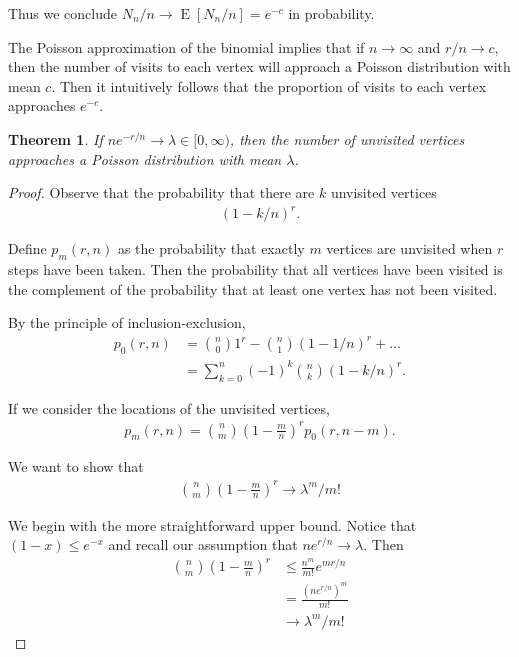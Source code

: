 \documentclass[12pt]{article}
\newtheorem{theorem}{Theorem}
\theoremstyle{definition}
\DeclareMathOperator{\E}{\mathrm{E}}		     %
\begin{document}
Thus we conclude $N_n/n \rightarrow \E[N_n/n] = e^{-c}$ in probability. 

The Poisson approximation of the binomial implies that if $n \rightarrow \infty$
and $r/n \rightarrow c$, then the number of visits to each vertex will approach
a Poisson distribution with mean $c$.
Then it intuitively follows that the proportion of visits to each vertex
approaches $e^{-c}$.

\begin{theorem}\label{thm:pois}
If $ne^{-r/n} \rightarrow \lambda \in [0, \infty)$, then the number of unvisited
vertices approaches a Poisson distribution with mean $\lambda$.
\end{theorem}

\begin{proof}
Observe that the probability that there are $k$ unvisited vertices
\begin{align}
(1-k/n)^r \nonumber.
\end{align}

Define $p_m(r,n)$ as the probability that exactly $m$ vertices are unvisited
when $r$ steps have been taken.
Then the probability that all vertices have been visited is the complement
of the probability that at least one vertex has not been visited.

By the principle of inclusion-exclusion,
\begin{align}
p_0(r,n) &= {n \choose 0} 1^r - {n \choose 1} (1-1/n)^r + ... \nonumber\\
&= \sum_{k=0}^n (-1)^k {n \choose k} (1-k/n)^r. \nonumber
\end{align}

If we consider the locations of the unvisited vertices,
\begin{align}
p_m(r,n) = {n \choose m} \left(1-\frac{m}{n}\right)^r p_0(r, n-m). \nonumber
\end{align}

We want to show that 
\begin{align}
{n \choose m} \left(1-\frac{m}{n}\right)^r \rightarrow \lambda ^m /m! \nonumber
\end{align}

We begin with the more straightforward upper bound.
Notice that $(1-x) \leq e^{-x}$ and recall our assumption that
$ne^{r/n} \rightarrow \lambda$.
Then
\begin{align}
{n \choose m} \left(1-\frac{m}{n}\right)^r &\leq \frac{n^m}{m!} e^{mr/n} \nonumber \\
&= \frac{(n e^{r/n})^m} {m!} \nonumber \\
&\rightarrow \lambda ^m / m! \nonumber
\end{align}


\end{proof}
\end{document}
